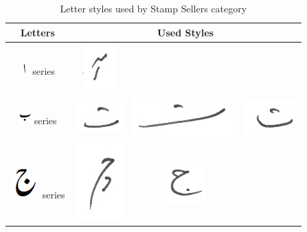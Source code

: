 \documentclass[a4paper,conference]{IEEEtran}
\begin{document}
\begin{table}[h]
\centering
\caption{Letter styles used by Stamp Sellers category}\label{tab6-ssc}
\begin{tabular}{@{}cccc@{}}
\hline
Letters	& \multicolumn{3}{c}{\textbf{Used Styles}} \\ \hline
\includegraphics[scale=0.50]{alif.png} series & \includegraphics[scale=0.25]{151} &  &   \\ 
\hline
\includegraphics[scale=0.50]{bay} series & \includegraphics[scale=0.20]{152} & \includegraphics[scale=0.20]{153}  &
\includegraphics[scale=0.20]{154}  \\
\hline
\includegraphics[scale=0.25]{jeeem} series & \includegraphics[scale=0.20]{155} & \includegraphics[scale=0.20]{156}  &

\end{tabular}
\end{table}
\end{document}
